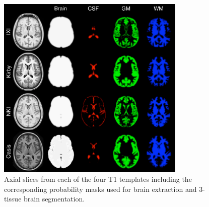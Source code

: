 \begin{figure}
  \centering
  \includegraphics[width=90mm]{Figures/templateProbabilityMasks.pdf}
  \caption{Axial slices from each of the four T1 templates including the corresponding
  probability masks used for brain extraction and 3-tissue brain segmentation.  
  }
  \label{fig:templateMasks}
\end{figure}


